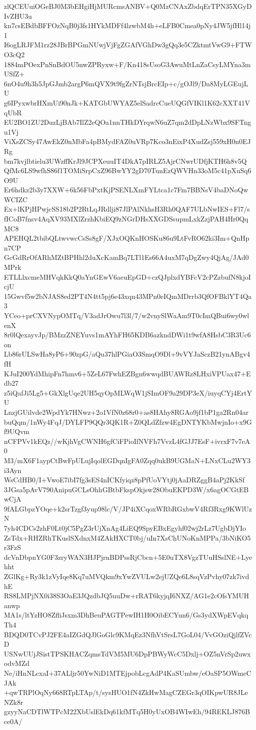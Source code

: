 zlQCEUuiOGeBJ0M3bEHgiHjMURcmsANBV+Q0MzCNAxZbdqErTPN35XGyDIvZHU3u
kn7csEBdbBFFOzNqB0j3fs1HYkMDFf4lzwbM4h+eLFB0Cmea0pNy4JW5jfHl14j1
I6ogLRJFM1rz28JBrBPGmNUwjVjFgZGAfVGhDw3gQq3e5CZktmtVwG9+FTWO3cQ2
1884mPOexPnSnBdOU5nwZPRyxw+F/Kn418sUsoG3AwuMtLnZaCsyLMYna3mUSfZ+
6nO4u9h3h5JpGJmb2argP6mQVX9t9fgZrNTsjBrcEIp+c/gOJl9/Da8MyLGEujLU
g6IPyxwbrHXmUi90nJk+KATGbUWYAZ5elSadrcCueUQGfVIKl1K62cXXT41VqUbR
EU2BO1ZU2DuzLjBAb7IlZ2eQOa1nnTHkDYrqwN6uZ7qm2dDpLNzWbx9SFTngu1Vj
ViXsZCSy47AwEkZ0nMbFa4pBMydFAZ0uVRp7Kco3nEixP4XudZsj559xH0n0EJRg
bm7kvjlbtielu3UWzffKrJl9JCPXeuuIT4DkA7pIRLZ5AjrCNwrUDfjKTH6h8v5Q
QfMc6LS9wfhS86f1TOMiSrpCxZ96BwYY2gD70TunEzQWVHn33oM5c41pXuSq6O9U
Er6hdkz2b3y7XXW+6k56FbPxtKjPSENLXmFYLtca1c7Fm7BBNsV4baDNoQwWCIZC
Ex+lKPjHPwjcSS18b2P2RtLqJRdlji87JlPAlNkhsH3Rh0QAF7ULbNwIES+Fl7/s
fICoB7fnsv4AqXV93MXlZrzhKbiEQ9zNGrDHsXXGDSsupmLxkZzjPAH4Hr0QqMC8
APEHQL2tbibQLtwvwcCsSs8gF/XJxOQKnHOSKu86u9LtFvRO62ki3Im+QnHpn7CP
GcGdRrOfARhMZtBPHhl2duXcKamBq7LTl1Es66A4uxM7qDgZwy4QjAg/JAd0MPrk
ETLLlxcmeMHVqkKkQ0aYnGEwV6aeuEpGD+czQJplxdYBFcV2cPZzbufN8kjoIcjU
15Gwvf5w2bNJAS8ed2PT4N4tt5pj6e43xqn43MPn0eIQmMDrrb3QfOFBklYT4Qa3
YCeo+prCXVNypOMTq/V3adJrOwu7l3l/7/w2vnySlWaAm9T0cImQBui6wy0wlenX
8r0lQexayvJp/BMzzZNEYuvs1mAYhFH65KDB6azkndDWi1t9wfA8HsbC3R3Uc6on
Lb86rULSwHa8yP6+90zpG/aQu37hlPGiaO3SmqO9Dl+9vVYJaSczB21ynABgv4fH
KJuI200YdMhipFn7hmv6+5ZeL67FwhEZBgn6wwqdBUAWRz8LHxiVPUax47+Edb27
z5iQafJi5Lg5+GkXlgUqe2UH5qyOpMLWqW1jSImOF9a29DP3eX/iuyqCYj4ErtYU
LnzjGUilvde2WpdYk7HNwz+2o1VfN0z68r0+as8HAhy8RGAo9jf1bP1ga2Rn04ar
buQqm/1nWy4FqJ/DYLFP9QQr3QK1R+Z0QLdZfzw4EgDNTYKbMwjnIo+x9Gf9UQvm
nCFPVv1kEQz//wKjhVgCWNH6gfCiFPioIfNVFh7VvzL4fGJJ7EsF+ivrxF7v7eA0
M3/mX6F1aypCtBwFpULujIqolEGDqnIgFA0Zqq0ukB9UGMaN+LNxCLu2WY3i3Ayn
WsCdHB0/I+VwoE7ibI7fg3sES4nICKfyiqz8pPfUoVYtj0jAaDRZggB4aPj2KkSf
3JGsa5pAvV790AnipuGCLsOhhGBtbFkspOkjsw28ObuEKPD3W/x6agOCGtEBwCjA
9fALGbpzYOqe+k2srTzgf3yup98lc/V/JP4iXCqoxWRbRGxbwV4Rf3Rxg9KWlUzN
7yh4CDCs2zhF0Lt0jC5PgZ3rUjXnAg4LiEQ9SpyEBxEgyhf02wj2rLz7UgbDjYIo
ZsTdx+RHZRhTKuslSXdnxM4ZAkHXCT0bj/uIn7XsChUNoKnMPPa/3bNiKO5r3FzS
dcVnDbpnYG0F3zryWAN3HJPjrnBDPssRjCbcn+5E0uTX8VgzTUuHSslNE+Lyehht
ZGlKg+Ry3k1zVyIqe8Kq7uMVQkm9xYwZVULw2ejUZQe6L8sqVzPvhy07zk7ivdhE
RS8LMPjNX0i38S3OaE3JQzdbJQ5uuDw+rRAT6kyjqI6NXZ/AG1e2cOfsYMUHanwp
MA1s/ltYzHO8ZfliJsxm3DhBeuPAGTPewIH1H0OibECYun6/Gs3ydXWpEVqkqTh4
BDQD0TCvPJ2FE4aIZGdQJlGoGlc9KMqEz3NfhVtSrsL7GoL04/VvGOziQjlfZVcD
USNwUUjJSistTPSKHACZqmsTdVM5MU6DpPBWyWcC5Dxlj+OZ5nVrSp2uwxodvMZd
Ne/iHnNLcxaI+37ALljr50YwNiD1MTEjpobLcgAdP4KaSUmbw/eOaSP5OWmeCJAk
+qwTRPlOqNy668RTpLTAp/t/sysHUO1fN4ZkHwMagCZEGr3qOIKpwUR8JLeNZk8r
gzyyNaCDTlWTPcM22XbUslEkDq61kfMTq5H0yUxOB4WIwEh/94REKLJ876Bce0A/
